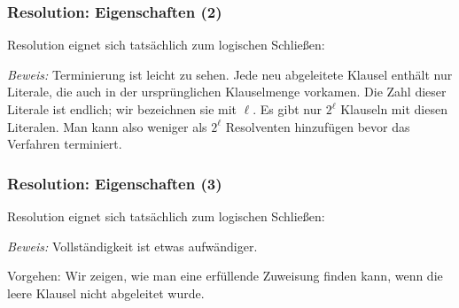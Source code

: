 \documentclass[aspectratio=1610,onlymath]{beamer}
\begin{document}
\begin{frame}[t]\frametitle{Resolution: Eigenschaften (2)}

Resolution eignet sich tatsächlich zum logischen Schließen:\medskip


\emph{Beweis:} \alert{Terminierung} ist leicht zu sehen.\pause{}
Jede neu abgeleitete Klausel enthält nur Literale,
die auch in der ursprünglichen Klauselmenge vorkamen. Die Zahl dieser Literale ist endlich; wir bezeichnen sie mit
$\ell$. Es gibt nur $2^\ell$ Klauseln mit diesen Literalen. Man kann also weniger als $2^\ell$ Resolventen hinzufügen bevor das Verfahren terminiert.

\end{frame}

\begin{frame}[t]\frametitle{Resolution: Eigenschaften (3)}

Resolution eignet sich tatsächlich zum logischen Schließen:\medskip


\emph{Beweis:} \alert{Vollständigkeit} ist etwas aufwändiger.\medskip

Vorgehen: Wir zeigen, wie
man eine erfüllende Zuweisung finden kann, wenn die leere Klausel nicht abgeleitet wurde.

\end{frame}
\end{document}

